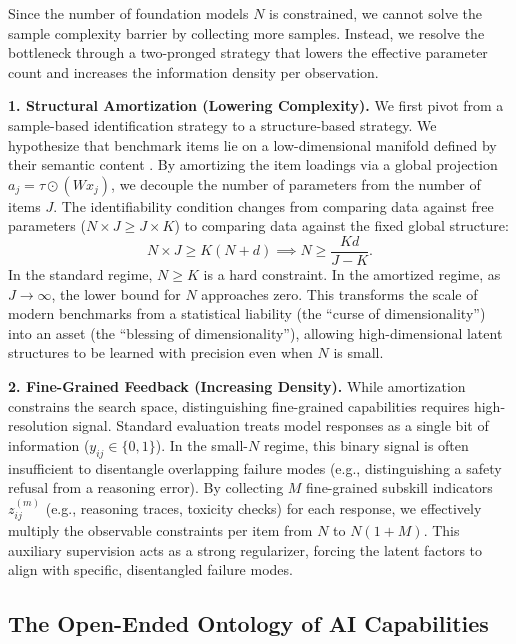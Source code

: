 \documentclass{article}
\theoremstyle{plain}
\theoremstyle{definition}
\theoremstyle{remark}
\begin{document}
Since the number of foundation models $N$ is constrained, we cannot solve the sample complexity barrier by collecting more samples. Instead, we resolve the bottleneck through a two-pronged strategy that lowers the effective parameter count and increases the information density per observation.

\textbf{1. Structural Amortization (Lowering Complexity).}
We first pivot from a sample-based identification strategy to a structure-based strategy. We hypothesize that benchmark items lie on a low-dimensional manifold defined by their semantic content \cite{udell2019bigdata}. By amortizing the item loadings via a global projection $a_j = \tau \odot (W x_j)$, we decouple the number of parameters from the number of items $J$. The identifiability condition changes from comparing data against free parameters ($N \times J \ge J \times K$) to comparing data against the fixed global structure:
\begin{equation}
    N \times J \ge K(N + d) \implies N \ge \frac{K d}{J - K}.
\end{equation}
In the standard regime, $N \ge K$ is a hard constraint. In the amortized regime, as $J \to \infty$, the lower bound for $N$ approaches zero. This transforms the scale of modern benchmarks from a statistical liability (the ``curse of dimensionality'') into an asset (the ``blessing of dimensionality''), allowing high-dimensional latent structures to be learned with precision even when $N$ is small.

\textbf{2. Fine-Grained Feedback (Increasing Density).}
While amortization constrains the search space, distinguishing fine-grained capabilities requires high-resolution signal. Standard evaluation treats model responses as a single bit of information ($y_{ij} \in \{0,1\}$). In the small-$N$ regime, this binary signal is often insufficient to disentangle overlapping failure modes (e.g., distinguishing a safety refusal from a reasoning error). By collecting $M$ fine-grained subskill indicators $z^{(m)}_{ij}$ (e.g., reasoning traces, toxicity checks) for each response, we effectively multiply the observable constraints per item from $N$ to $N(1 + M)$. This auxiliary supervision acts as a strong regularizer, forcing the latent factors to align with specific, disentangled failure modes.

\subsection{The Open-Ended Ontology of AI Capabilities}
\end{document}
